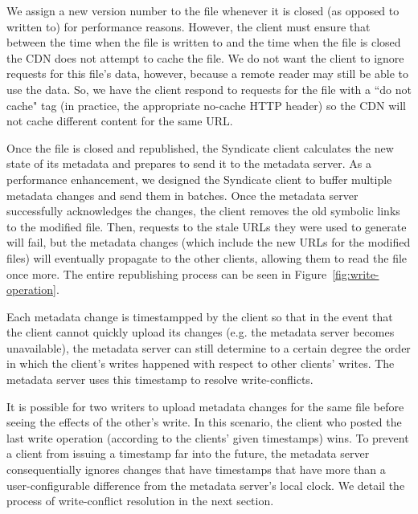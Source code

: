 We assign a new version number to the file whenever it is closed 
(as opposed to written to) for performance reasons.  However, the client
must ensure that between the time when the file is written to and the time
when the file is closed the CDN does not attempt to cache the file.
We do not want the client to ignore requests for this file's data, however, because
a remote reader may still be able to use the data.  So, we have the client
respond to requests for the file with a ``do not cache" tag (in practice, 
the appropriate no-cache HTTP header) so the CDN will not cache different content
for the same URL.

Once the file is closed and republished, the Syndicate client calculates the
new state of its metadata and prepares to send it to the metadata server.
As a performance enhancement, we designed the Syndicate client to buffer
multiple metadata changes and send them in batches.  Once the metadata
server successfully acknowledges the changes, the client removes
the old symbolic links to the modified file.  Then, requests to the stale
URLs they were used to generate will fail, but the metadata changes
(which include the new URLs for the modified files) will eventually propagate
to the other clients, allowing them to read the file once more.  The entire republishing process can be seen in Figure~\ref{fig:write-operation}.

Each metadata change is timestampped by the client so that in the event
that the client cannot quickly upload its changes (e.g. the metadata
server becomes unavailable), the metadata server can still determine to a certain
degree the order in which the client's writes happened with respect to
other clients' writes.  The metadata server uses this timestamp to resolve
write-conflicts.

It is possible for two writers to upload metadata changes for the same file
before seeing the effects of the other's write.  In this scenario, the
client who posted the last write operation (according to the clients' given
timestamps) wins.  To prevent a client from issuing a timestamp far into the
future, the metadata server consequentially ignores changes that
have timestamps that have more than a user-configurable difference from the 
metadata server's local clock.  We detail the process of write-conflict resolution
in the next section.	



